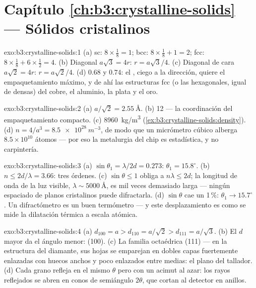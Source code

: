 \section*{Capítulo \ref{ch:b3:crystalline-solids} --- Sólidos cristalinos}

\begin{solution}{exo:b3:crystalline-solids:1}
(a) sc: $8\times\tfrac18 = 1$; bcc: $8\times\tfrac18 + 1 = 2$;
fcc: $8\times\tfrac18 + 6\times\tfrac12 = 4$. (b) Diagonal
$a\sqrt3 = 4r$: $r = a\sqrt3/4$. (c) Diagonal de cara $a\sqrt2 = 4r$:
$r = a\sqrt2/4$. (d) $0.68$ y $0.74$: el ,
ciego a la dirección, quiere el empaquetamiento máximo, y de ahí las estructuras fcc
(o las hexagonales, igual de densas) del cobre, el aluminio, la plata y el oro.
\end{solution}

\begin{solution}{exo:b3:crystalline-solids:2}
(a) $a/\sqrt2 = \qty{2.55}{\angstrom}$. (b) 12 --- la
coordinación del empaquetamiento compacto. (c) \qty{8960}{kg/m^3}
(\cref{ex:b3:crystalline-solids:density}). (d) $n = 4/a^3 =
\qty{8.5e28}{m^{-3}}$, de modo que un micrómetro cúbico alberga
$8.5\times10^{10}$ átomos --- por eso la metalurgia del chip es
estadística, y no carpintería.
\end{solution}

\begin{solution}{exo:b3:crystalline-solids:3}
(a) $\sin\theta_1 = \lambda/2d = 0.273$: $\theta_1 =
15.8^\circ$. (b) $n \le 2d/\lambda = 3.66$: tres órdenes. (c)
$\sin\theta \le 1$ obliga a $n\lambda \le 2d$; la longitud de onda de la
luz visible, $\lambda \sim \qty{5000}{\angstrom}$, es mil veces demasiado larga
--- ningún espaciado de planos cristalinos puede difractarla. (d) $\sin\theta$
cae un 1\,\%: $\theta_1 \to 15.7^\circ$. Un difractómetro es un buen
termómetro --- y este desplazamiento es como se mide la dilatación térmica
a escala atómica.
\end{solution}

\begin{solution}{exo:b3:crystalline-solids:4}
(a) $d_{100} = a > d_{110} = a/\sqrt2 > d_{111} = a/\sqrt3$. (b)
El $d$ mayor da el ángulo menor: (100). (c) La familia octaédrica (111)
--- en la estructura del diamante, sus hojas se emparejan en dobles capas
fuertemente enlazadas con huecos anchos y poco enlazados entre medias:
el plano del tallador. (d) Cada grano refleja en el mismo $\theta$
pero con un acimut al azar: los rayos reflejados se abren en conos de
semiángulo $2\theta$, que cortan al detector en anillos.
\end{solution}

